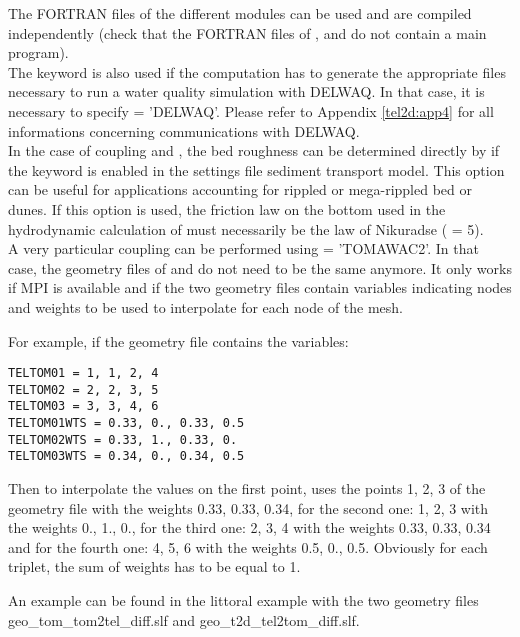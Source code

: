The FORTRAN files of the different modules can be used and are compiled
independently (check that the FORTRAN files of \gaia, \sisyphe and \tomawac
do not contain a main program).\\

The keyword  is also used if the computation
has to generate the appropriate files necessary to run a water quality
simulation with DELWAQ.
In that case, it is necessary to specify  = 'DELWAQ'.
Please refer to Appendix \ref{tel2d:app4} for all informations concerning
communications with DELWAQ.\\

In the case of coupling  and \sisyphe, the bed roughness can be
determined directly by \sisyphe if the keyword
 is enabled in the settings file
sediment transport model. This option can be useful for applications
accounting for rippled or mega-rippled bed or dunes.
If this option is used, the friction law on the bottom used
in the hydrodynamic calculation of  must necessarily be
the law of Nikuradse ( = 5).\\

A very particular coupling can be performed using  =
'TOMAWAC2'.
In that case, the geometry files of  and \tomawac do not need
to be the same anymore.
It only works if MPI is available and if the two geometry files contain
variables indicating nodes and weights to be used to interpolate for each node
of the mesh.

For example, if the \tomawac geometry file contains the variables:

\begin{lstlisting}
TELTOM01 = 1, 1, 2, 4
TELTOM02 = 2, 2, 3, 5
TELTOM03 = 3, 3, 4, 6
TELTOM01WTS = 0.33, 0., 0.33, 0.5
TELTOM02WTS = 0.33, 1., 0.33, 0.
TELTOM03WTS = 0.34, 0., 0.34, 0.5
\end{lstlisting}

Then to interpolate the values on the first point,
\tomawac uses the points 1, 2, 3 of the  geometry file with the
weights 0.33, 0.33, 0.34,
for the second one: 1, 2, 3 with the weights 0., 1., 0.,
for the third one: 2, 3, 4 with the weights 0.33, 0.33, 0.34
and for the fourth one: 4, 5, 6 with the weights 0.5, 0., 0.5.
Obviously for each triplet, the sum of weights has to be equal to 1.

An example can be found in the littoral \sisyphe example with the two
geometry files geo\_tom\_tom2tel\_diff.slf and
geo\_t2d\_tel2tom\_diff.slf.

